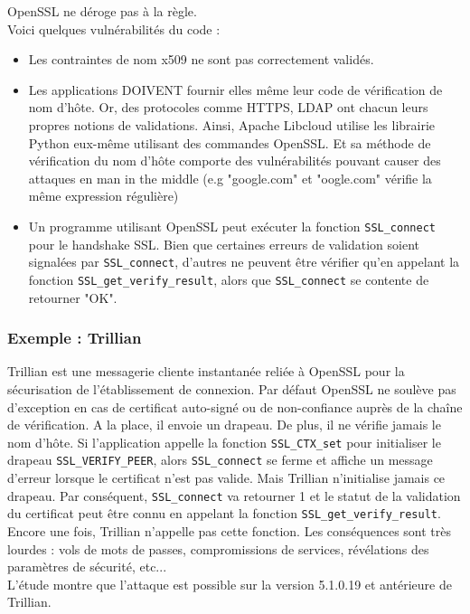 OpenSSL ne déroge pas à la règle.\\
Voici quelques vulnérabilités du code :
\begin{itemize}
\item Les contraintes de nom x509 ne sont pas correctement validés.
\item Les applications DOIVENT fournir elles même leur code de vérification de nom d'hôte. Or, des protocoles comme HTTPS, LDAP ont chacun leurs propres notions de validations. Ainsi, Apache Libcloud utilise les librairie Python eux-même utilisant des commandes OpenSSL. Et sa méthode de vérification du nom d'hôte comporte des vulnérabilités pouvant causer des attaques en man in the middle (e.g "google.com" et "oogle.com" vérifie la même expression régulière)
\item Un programme utilisant OpenSSL peut exécuter la fonction \texttt{SSL\_connect} pour le handshake SSL. Bien que certaines erreurs de validation soient signalées par \texttt{SSL\_connect}, d'autres ne peuvent être vérifier qu'en appelant la fonction \texttt{SSL\_get\_verify\_result}, alors que \texttt{SSL\_connect} se contente de retourner "OK".
\end{itemize}

\subsubsection{Exemple : Trillian}

Trillian est une messagerie cliente instantanée reliée à OpenSSL pour la sécurisation de l'établissement de connexion. Par défaut OpenSSL ne soulève pas d'exception en cas de certificat auto-signé ou de non-confiance auprès de la chaîne de vérification. A la place, il envoie un drapeau. De plus, il ne vérifie jamais le nom d'hôte. Si l'application appelle la fonction \texttt{SSL\_CTX\_set} pour initialiser le drapeau \texttt{SSL\_VERIFY\_PEER}, alors \texttt{SSL\_connect} se ferme et affiche un message d'erreur lorsque le certificat n'est pas valide. Mais Trillian n'initialise jamais ce drapeau. Par conséquent, \texttt{SSL\_connect} va retourner 1 et le statut de la validation du certificat peut être connu en appelant la fonction \texttt{SSL\_get\_verify\_result}. Encore une fois, Trillian n'appelle pas cette fonction. Les conséquences sont très lourdes : vols de mots de passes, compromissions de services, révélations des paramètres de sécurité, etc...\\


L'étude montre que l'attaque est possible sur la version 5.1.0.19 et antérieure de Trillian.

